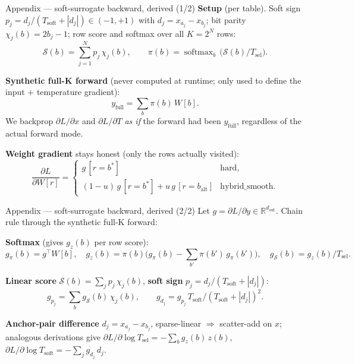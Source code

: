 \documentclass[aspectratio=169]{beamer}
\newcommand{\R}{\mathbb{R}}
\newcommand{\bstar}{b^{*}}
\newcommand{\Tsoft}{T_{\mathrm{soft}}}
\newcommand{\Tsel}{T_{\mathrm{sel}}}
\newcommand{\dout}{d_{\mathrm{out}}}
\newcommand{\softmax}{\operatorname{softmax}}
\begin{document}
\begin{frame}{Appendix --- soft-surrogate backward, derived (1/2)}
\small
\textbf{Setup} (per table). \;
Soft sign \(p_j = d_j/(\Tsoft + |d_j|) \in (-1, +1)\) with \(d_j = x_{a_j} - x_{b_j}\); bit parity \(\chi_j(b) = 2 b_j - 1\); row score and softmax over all \(K = 2^N\) rows:
\[ \mathcal{S}(b) = \sum_{j=1}^{N} p_j\, \chi_j(b), \qquad \pi(b) = \softmax_b\,\bigl(\mathcal{S}(b)/\Tsel\bigr). \]

\textbf{Synthetic full-K forward} (never computed at runtime; only used to define the input + temperature gradient):
\[ y_{\mathrm{full}} = \sum_b \pi(b)\, W[b]. \]
We backprop \(\partial L / \partial x\) and \(\partial L / \partial T\) \emph{as if} the forward had been \(y_{\mathrm{full}}\), regardless of the actual forward mode.

\textbf{Weight gradient} stays honest (only the rows actually visited):
\[
\frac{\partial L}{\partial W[r]} =
\begin{cases}
g\, [r = \bstar] & \text{hard,}\\
(1{-}u)\, g\, [r = \bstar] + u\, g\, [r = b_{\mathrm{alt}}] & \text{hybrid\_smooth.}
\end{cases}
\]
\end{frame}

\begin{frame}{Appendix --- soft-surrogate backward, derived (2/2)}
Let \(g = \partial L / \partial y \in \R^{\dout}\). Chain rule through the synthetic full-K forward:

\smallskip
\small
\textbf{Softmax} (gives \(g_z(b)\) per row score):
\[
g_\pi(b) = g^{\top} W[b], \quad
g_z(b) = \pi(b)\bigl(g_\pi(b) - \textstyle\sum_{b'} \pi(b')\, g_\pi(b')\bigr), \quad
g_{\mathcal S}(b) = g_z(b) / \Tsel.
\]

\textbf{Linear score} \(\mathcal{S}(b) = \sum_j p_j\, \chi_j(b)\), \textbf{soft sign} \(p_j = d_j/(\Tsoft + |d_j|)\):
\[
g_{p_j} = \sum_b g_{\mathcal S}(b)\, \chi_j(b), \qquad
g_{d_j} = g_{p_j}\,\Tsoft / (\Tsoft + |d_j|)^{2}.
\]

\textbf{Anchor-pair difference} \(d_j = x_{a_j} - x_{b_j}\), sparse-linear \(\Rightarrow\) scatter-add on \(x\); analogous derivations give \(\partial L/\partial \log \Tsel = -\sum_b g_z(b)\, z(b)\), \(\partial L/\partial \log \Tsoft = -\sum_j g_{d_j}\, d_j.\)
\end{frame}
\end{document}
